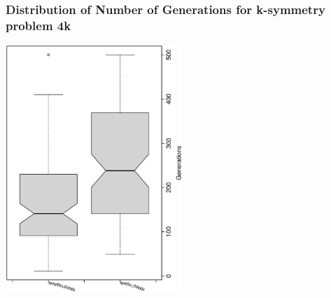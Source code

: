  \begin{frame}
 \frametitle{ Distribution of Number of Generations for k-symmetry problem 4k }
 \begin{center}
\includegraphics[width=0.5\textwidth, angle=-90]
{ExpDboxplottGenerations002.eps}
 \end{center}
 \label{ExpDboxplottGenerations002.eps}  
 \end{frame}

